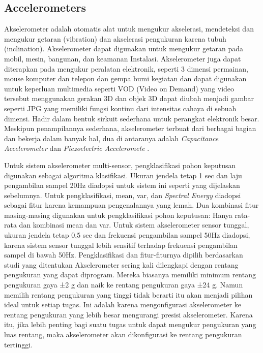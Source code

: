 \subsection{Accelerometers}

Akselerometer adalah otomatis alat untuk mengukur akselerasi, mendeteksi dan mengukur getaran (vibration) dan akselerasi pengukuran karena tubuh (inclination). Akselerometer dapat 
digunakan untuk mengukur getaran pada mobil, mesin, bangunan, dan keamanan Instalasi. Akselerometer juga dapat diterapkan pada mengukur peralatan elektronik, seperti 3 dimensi permainan, 
mouse komputer dan telepon dan gempa bumi kegiatan dan dapat digunakan untuk keperluan multimedia seperti VOD (Video on Demand) yang video tersebut menggunakan gerakan 3D dan objek 3D 
dapat diubah menjadi gambar seperti JPG yang memiliki fungsi kontinu dari intensitas cahaya di sebuah dimensi. Hadir dalam bentuk sirkuit sederhana untuk perangkat elektronik besar. 
Meskipun penampilannya sederhana, akselerometer terbuat dari berbagai bagian dan bekerja dalam banyak hal, dua di antaranya adalah \emph{Capacitance Accelerometer} 
dan \emph{Piezoelectric Acceleromete} \parencite{Randell2003}. 

Untuk sistem akselerometer multi-sensor, pengklasifikasi pohon keputusan digunakan sebagai algoritma klasifikasi. Ukuran jendela tetap 1 sec dan laju pengambilan sampel 20Hz diadopsi untuk sistem ini seperti yang dijelaskan sebelumnya. Untuk pengklasifikasi, mean, var, 
dan \emph{Spectral Energy} diadopsi sebagai fitur karena kemampuan pengenalannya yang lemah. Dua kombinasi fitur masing-masing digunakan untuk pengklasifikasi pohon keputusan: Hanya rata-rata
dan kombinasi mean dan var. Untuk sistem akselerometer sensor tunggal, ukuran jendela tetap 0,5 sec dan frekuensi pengambilan sampel 50Hz diadopsi, karena sistem sensor tunggal lebih 
sensitif terhadap frekuensi pengambilan sampel di bawah 50Hz. Pengklasifikasi dan fitur-fiturnya dipilih berdasarkan studi yang ditentukan Akselerometer sering kali dilengkapi dengan 
rentang pengukuran yang dapat diprogram. Mereka biasanya memiliki minimum rentang pengukuran gaya ±2 g dan naik ke rentang pengukuran gaya ±24 g. Namun memilih rentang pengukuran yang 
tinggi tidak berarti itu akan menjadi pilihan ideal untuk setiap tugas. Ini adalah karena mengonfigurasi akselerometer ke rentang pengukuran yang lebih besar mengurangi presisi 
akselerometer. Karena itu, jika lebih penting bagi suatu tugas untuk dapat mengukur pengukuran yang luas rentang, maka akselerometer akan dikonfigurasi ke rentang pengukuran tertinggi.

